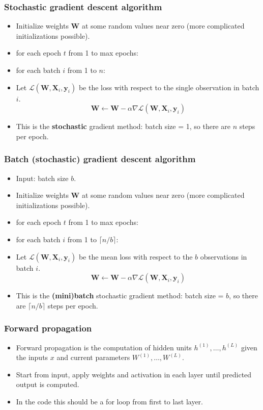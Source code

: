 \documentclass{beamer}
\begin{document}
\begin{frame}[fragile]
  \frametitle{Stochastic gradient descent algorithm}
  \begin{itemize}
  \item Initialize weights $\mathbf W$ at some random values near
    zero (more complicated initializations possible).
  \item for each epoch $t$ from 1 to max epochs:
  \item for each batch $i$ from 1 to $n$:
  \item Let $\mathcal L( \mathbf W, \mathbf X_i, \mathbf y_i )$ be the loss with
    respect to the single observation in batch $i$.
$$
\mathbf W \gets \mathbf W - \alpha \nabla \mathcal L(\mathbf W, \mathbf X_i, \mathbf y_i)
$$
\item This is the \textbf{stochastic} gradient method: batch size = 1,
  so there are $n$ steps per epoch.
\end{itemize}

\end{frame}

\begin{frame}[fragile]
  \frametitle{Batch (stochastic) gradient descent algorithm}
  \begin{itemize}
  \item Input: batch size $b$.
  \item Initialize weights $\mathbf W$ at some random values near
    zero (more complicated initializations possible).
  \item for each epoch $t$ from 1 to max epochs:
  \item for each batch $i$ from 1 to $\lceil n/b \rceil$:
  \item Let $\mathcal L( \mathbf W, \mathbf X_i, \mathbf y_i )$ be the
    mean loss with respect to the $b$ observations in batch $i$.
  $$
\mathbf W \gets \mathbf W - \alpha \nabla \mathcal L(\mathbf W, \mathbf X_i, \mathbf y_i)
$$
\item This is the \textbf{(mini)batch} stochastic gradient method:
  batch size = $b$, so there are $\lceil n/b \rceil$ steps per epoch.
\end{itemize}

\end{frame}

\begin{frame}[fragile]
  \frametitle{Forward propagation}
  \begin{itemize}
\item Forward propagation is the computation of hidden units
$h^{(1)},\dots,h^{(L)}$ given the inputs $x$ and current parameters
$W^{(1)},\dots,W^{(L)}$.
\item Start from input, apply weights and activation in each layer until
  predicted output is computed.
\item In the code this should be a for loop from first to last layer.
  \end{itemize}
\end{frame}
\end{document}
